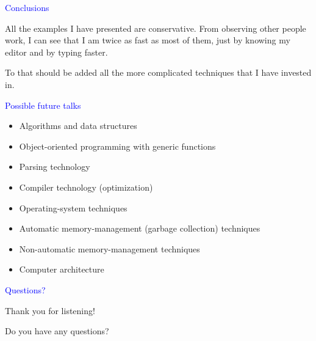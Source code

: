 \documentclass{slides}
\newcommand{\ti}[1]{\begin{center}\Large{\textcolor{blue}{#1}}\end{center}}
\begin{document}
\begin{slide}\ti{Conclusions}

All the examples I have presented are conservative.  From observing
other people work, I can see that I am twice as fast as most of them,
just by knowing my editor and by typing faster.

To that should be added all the more complicated techniques that I
have invested in.

\vfill\end{slide}
\begin{slide}\ti{Possible future talks}

  \begin{itemize}
  \item Algorithms and data structures
  \item Object-oriented programming with generic functions
  \item Parsing technology
  \item Compiler technology (optimization)
  \item Operating-system techniques
  \item Automatic memory-management (garbage collection) techniques
  \item Non-automatic memory-management techniques
  \item Computer architecture
  \end{itemize}

\vfill\end{slide}
\begin{slide}\ti{Questions?}

Thank you for listening!

Do you have any questions?

\vfill\end{slide}


\end{document}
